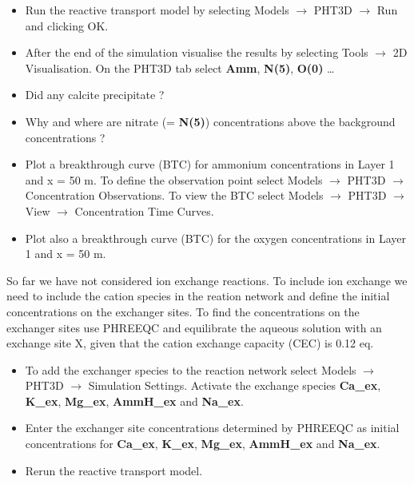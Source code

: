\begin{itemize}
\item Run the reactive transport model by selecting Models $\rightarrow$ PHT3D $\rightarrow$ Run and clicking OK.

\item After the end of the simulation visualise the results by selecting Tools $\rightarrow$ 2D Visualisation. On the PHT3D tab select {\color{red} \textbf{Amm}}, {\color{red} \textbf{N(5)}}, {\color{red} \textbf{O(0)}} \ldots 

\item Did any calcite precipitate ?

\item Why and where are nitrate (= {\color{red} \textbf{N(5)}}) concentrations above the background concentrations ?

\item Plot a breakthrough curve (BTC) for ammonium concentrations in Layer 1
and x = 50 m. To define the observation point select Models $\rightarrow$ PHT3D $\rightarrow$ Concentration Observations. To view the BTC select Models $\rightarrow$ PHT3D $\rightarrow$ View
$\rightarrow$ Concentration Time Curves.

\item Plot also a breakthrough curve (BTC) for the oxygen concentrations in Layer 1
and x = 50 m. 

\end{itemize}

So far we have not considered ion exchange reactions. To include ion exchange
we need to include the cation species in the reation network and define the
initial concentrations on the exchanger sites. To find the concentrations
on the exchanger sites use PHREEQC and equilibrate the aqueous solution
with an exchange site X, given that the cation exchange capacity (CEC) 
is 0.12 eq. 

\begin{itemize}

\item To add the exchanger species to the reaction network
select Models $\rightarrow$ PHT3D $\rightarrow$ Simulation Settings. 
Activate the exchange species {\color{red} \textbf{Ca\_ex}}, {\color{red}\textbf{K\_ex}}, {\color{red} \textbf{Mg\_ex}},
{\color{red} \textbf{AmmH\_ex}} and {\color{red} \textbf{Na\_ex}}.

\item Enter the exchanger site concentrations determined by PHREEQC as
initial concentrations for {\color{red} \textbf{Ca\_ex}}, {\color{red}\textbf{K\_ex}}, {\color{red} \textbf{Mg\_ex}},
{\color{red} \textbf{AmmH\_ex}} and {\color{red} \textbf{Na\_ex}}.

\item Rerun the reactive transport model.
\end{itemize}

